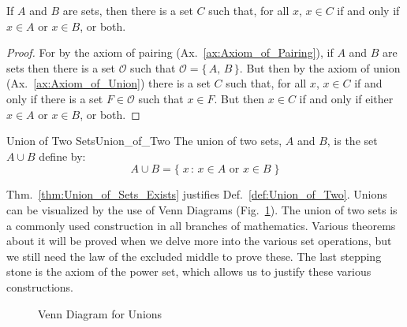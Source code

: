         \begin{theorem}
            \label{thm:Union_of_Sets_Exists}%
            If $A$ and $B$ are sets, then there is a set $C$ such that, for
            all $x$, $x\in{C}$ if and only if $x\in{A}$ or $x\in{B}$, or both.
        \end{theorem}
        \begin{proof}
            For by the axiom of pairing (Ax.~\ref{ax:Axiom_of_Pairing}), if
            $A$ and $B$ are sets then there is a set $\mathcal{O}$ such
            that $\mathcal{O}=\{\,A,\,B\,\}$. But then by the axiom of union
            (Ax.~\ref{ax:Axiom_of_Union}) there is a set $C$ such that, for
            all $x$, $x\in{C}$ if and only if there is a set $F\in\mathcal{O}$
            such that $x\in{F}$. But then $x\in{C}$ if and only if either
            $x\in{A}$ or $x\in{B}$, or both.
        \end{proof}
        \begin{fdefinition}{Union of Two Sets}{Union_of_Two}
            The \gls{union of two sets}, $A$ and $B$, is the set
            $A\cup{B}$ define by:
            \begin{equation}
                A\cup{B}=\{\;x\,:\,x\in{A}\textrm{ or }x\in{B}\;\}
            \end{equation}
        \end{fdefinition}
        Thm.~\ref{thm:Union_of_Sets_Exists} justifies
        Def.~\ref{def:Union_of_Two}. Unions can be visualized by the use of
        Venn Diagrams (Fig.~\ref{fig:Venn_Diagram_Union}). The union of two
        sets is a commonly used construction in all branches of mathematics.
        Various theorems about it will be proved when we delve more into the
        various set operations, but we still need the law of the excluded
        middle to prove these. The last stepping stone is the axiom of the
        power set, which allows us to justify these various constructions.
        \begin{figure}[H]
            \centering
            
            \caption{Venn Diagram for Unions}
            \label{fig:Venn_Diagram_Union}
        \end{figure}
